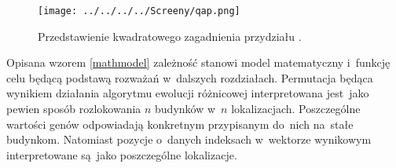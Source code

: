 \begin{figure}[h!]
\begin{center}
		\texttt{[image: ../../../../Screeny/qap.png]}
		\caption{Przedstawienie kwadratowego zagadnienia przydziału \cite{qap_rys}.}
		\label{qap}		
\end{center}	
\end{figure}

Opisana wzorem \ref{mathmodel} zależność stanowi model matematyczny i~funkcję celu będącą podstawą rozważań w~dalszych rozdziałach. Permutacja będąca wynikiem działania algorytmu ewolucji różnicowej interpretowana jest~jako pewien sposób rozlokowania $n$ budynków w~$n$ lokalizacjach. Poszczególne wartości genów odpowiadają konkretnym przypisanym do~nich na~stałe budynkom. Natomiast pozycje o~danych indeksach w~wektorze wynikowym interpretowane są~jako poszczególne lokalizacje.